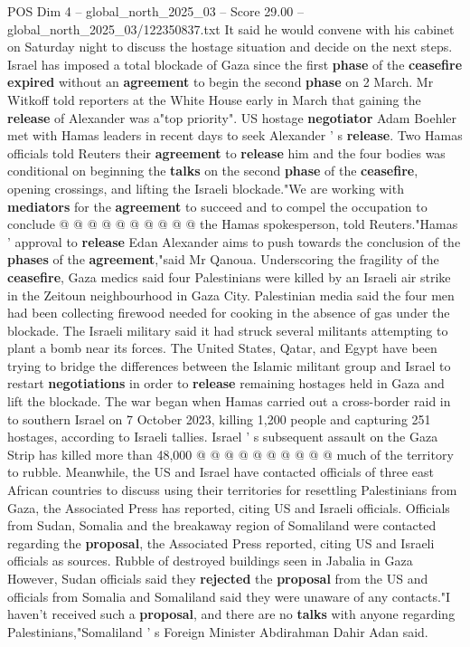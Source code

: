 \begin{textsample}{POS Dim 4 – global\_north\_2025\_03 – Score 29.00 – global\_north\_2025\_03/122350837.txt}
It said he would convene with his cabinet on Saturday night to discuss the hostage situation and decide on the next steps.
Israel has imposed a total blockade of Gaza since the first \textbf{phase} of the \textbf{ceasefire} \textbf{expired} without an \textbf{agreement} to begin the second \textbf{phase} on 2 March.
Mr Witkoff told reporters at the White House early in March that gaining the \textbf{release} of Alexander was a"top priority".
US hostage \textbf{negotiator} Adam Boehler met with Hamas leaders in recent days to seek Alexander ' s \textbf{release}.
Two Hamas officials told Reuters their \textbf{agreement} to \textbf{release} him and the four bodies was conditional on beginning the \textbf{talks} on the second \textbf{phase} of the \textbf{ceasefire}, opening crossings, and lifting the Israeli blockade."We are working with \textbf{mediators} for the \textbf{agreement} to succeed and to compel the occupation to conclude @ @ @ @ @ @ @ @ @ @ the Hamas spokesperson, told Reuters."Hamas ' approval to \textbf{release} Edan Alexander aims to push towards the conclusion of the \textbf{phases} of the \textbf{agreement},"said Mr Qanoua.
Underscoring the fragility of the \textbf{ceasefire}, Gaza medics said four Palestinians were killed by an Israeli air strike in the Zeitoun neighbourhood in Gaza City.
Palestinian media said the four men had been collecting firewood needed for cooking in the absence of gas under the blockade.
The Israeli military said it had struck several militants attempting to plant a bomb near its forces.
The United States, Qatar, and Egypt have been trying to bridge the differences between the Islamic militant group and Israel to restart \textbf{negotiations} in order to \textbf{release} remaining hostages held in Gaza and lift the blockade.
The war began when Hamas carried out a cross-border raid in to southern Israel on 7 October 2023, killing 1,200 people and capturing 251 hostages, according to Israeli tallies.
Israel ' s subsequent assault on the Gaza Strip has killed more than 48,000 @ @ @ @ @ @ @ @ @ @ much of the territory to rubble.
Meanwhile, the US and Israel have contacted officials of three east African countries to discuss using their territories for resettling Palestinians from Gaza, the Associated Press has reported, citing US and Israeli officials.
Officials from Sudan, Somalia and the breakaway region of Somaliland were contacted regarding the \textbf{proposal}, the Associated Press reported, citing US and Israeli officials as sources.
Rubble of destroyed buildings seen in Jabalia in Gaza However, Sudan officials said they \textbf{rejected} the \textbf{proposal} from the US and officials from Somalia and Somaliland said they were unaware of any contacts."I haven't received such a \textbf{proposal}, and there are no \textbf{talks} with anyone regarding Palestinians,"Somaliland ' s Foreign Minister Abdirahman Dahir Adan said.

\end{textsample}
